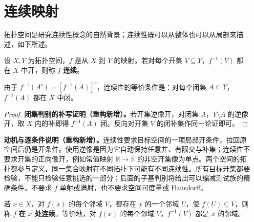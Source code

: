 \documentclass[../../main.tex]{subfiles}%
\begin{document}
\section{连续映射}\label{section:ch04-continuous-maps}
拓扑空间是研究连续性概念的自然背景；连续性既可以从整体也可以从局部来描述，如下所述。
\begin{definition}[连续映射]\label{definition:ch04-continuous-map}
设 $X,Y$ 为拓扑空间，$f$ 是从 $X$ 到 $Y$ 的映射。若对每个开集 $V\subseteq Y$，$f^{-1}(V)$ 都在 $X$ 中开，则称 $f$ \textbf{连续}。
\end{definition}
\begin{proposition}\label{proposition:ch04-continuity-closed-preimages}
由于 $f^{-1}(A^c)=[f^{-1}(A)]^c$，连续性的等价条件是：对每个闭集 $A\subseteq Y$，$f^{-1}(A)$ 都在 $X$ 中闭。
\end{proposition}
\begin{proof}
\textbf{闭集判别的补写证明（重构新增）。}若开集逆像开，对闭集 $A$，$Y\setminus A$ 的逆像开，取 $X$ 内的补即得 $f^{-1}(A)$ 闭。反向对开集 $V$ 的闭补集作同一论证即可。
\end{proof}
\begin{remark}
\textbf{动机与逐条件说明（重构新增）。}连续性要求目标空间的一项局部开条件，拉回原空间后仍是开条件。使用逆像是因为它自动保持任意并、有限交与补集；连续性不要求开集的正向像开，例如常值映射 $\mathbb R\to\mathbb R$ 的非空开集像为单点。两个空间的拓扑都参与定义，同一集合映射在不同拓扑下可能有不同连续性。所有目标开集都要检验，不能只检验任意挑选的一部分；后面的子基判别将给出可以缩减测试族的精确条件。不要求 $f$ 单射或满射，也不要求空间可度量或 Hausdorff。
\end{remark}
\begin{definition}[在一点连续]\label{definition:ch04-continuous-at-point}
若 $x\in X$，对 $f(x)$ 的每个邻域 $V$，都存在 $x$ 的一个邻域 $U$，使 $f(U)\subseteq V$，则称 $f$ \textbf{在 $x$ 处连续}。等价地，对 $f(x)$ 的每个邻域 $V$，$f^{-1}(V)$ 都是 $x$ 的邻域。
\end{definition}
\end{document}
